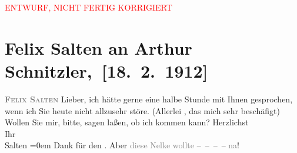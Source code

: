 
\begin{center}
            \textcolor{red}{ENTWURF, NICHT FERTIG KORRIGIERT}
                      \end{center}
            
         
         \renewcommand{\erwaehntePersonen}{Personen: Felix Salten}
         \renewcommand{\erwaehnteInstitutionen}{Institutionen: Bauernfeld-Preis}
         \renewcommand{\erwaehnteOrte}{Orte: Wien}
         \renewcommand{\erwaehnteWerke}{}
               \section[ Felix Salten an Arthur Schnitzler, {[}18. 2. 1912{]}]{ Felix Salten an Arthur Schnitzler, {[}18. 2. 1912{]}}\nopagebreak{}\rehead{ }\begin{ledgroupsized}[t]{13cm}\normalsize\beginnumbering \toendnotes[C]{\smallbreak\pagebreak[2]} 
\toendnotes[C]{\smallbreak}\pstart
           \noindent{}\centering{}{\pb}\textcolor{gray}{\textbf{\textcolor{gray}{\textbf{\textsc{Felix Salten}}}}}\pend
           \pstart
           Lieber, ich hätte gerne eine halbe Stunde mit Ihnen gesprochen, wenn
               ich Sie heute nicht allzusehr störe. (Allerlei \label{K_L03556-1v}\label{K_L03556-1h}, das mich sehr beschäfigt) Wollen Sie mir, bitte, sagen laßen, ob ich kommen
               kann?\pend
           \pstart
           Herzlichst{\\[\baselineskip]} Ihr {\\[\baselineskip]}\spacefill\mbox{Salten}\pend
           \leftskip=0em{}\pstart
           \noindent{}Dank für den \label{K_L03556-2v}\label{K_L03556-2h}.
                  Aber \textcolor{gray}{diese Nelke wollte} – – – – \textcolor{gray}{na}!\pend
           
         
         \endnumbering{}\end{ledgroupsized}  \newcommand{\dateiname}{L03556}\newcommand{\titel}{Felix Salten an Arthur Schnitzler, [18. 2. 1912]}\newcommand{\editorInnen}{Martin Anton Müller und Laura Untner}
      